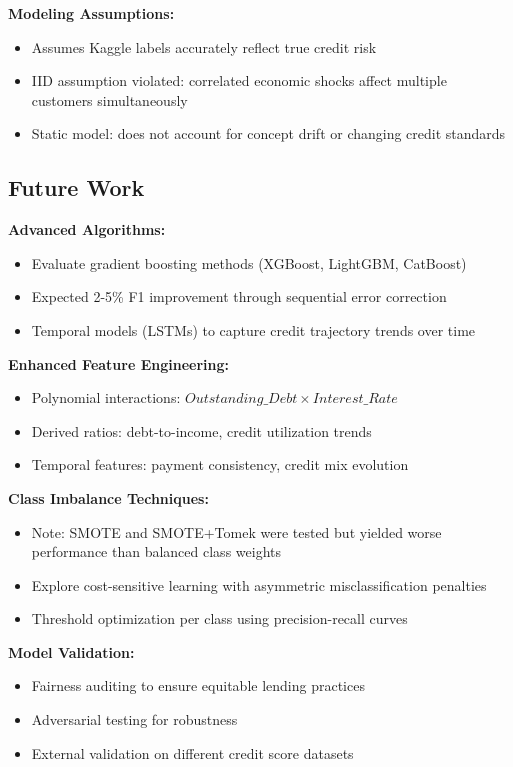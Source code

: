 \documentclass[11pt, a4paper]{article}
\begin{document}
\textbf{Modeling Assumptions:}
\begin{itemize}
    \item Assumes Kaggle labels accurately reflect true credit risk
    \item IID assumption violated: correlated economic shocks affect multiple customers simultaneously
    \item Static model: does not account for concept drift or changing credit standards
\end{itemize}

\subsection{Future Work}

\textbf{Advanced Algorithms:}
\begin{itemize}
    \item Evaluate gradient boosting methods (XGBoost, LightGBM, CatBoost)
    \item Expected 2-5\% F1 improvement through sequential error correction
    \item Temporal models (LSTMs) to capture credit trajectory trends over time
\end{itemize}

\textbf{Enhanced Feature Engineering:}
\begin{itemize}
    \item Polynomial interactions: $Outstanding\_Debt \times Interest\_Rate$
    \item Derived ratios: debt-to-income, credit utilization trends
    \item Temporal features: payment consistency, credit mix evolution
\end{itemize}

\textbf{Class Imbalance Techniques:}
\begin{itemize}
    \item Note: SMOTE and SMOTE+Tomek were tested but yielded worse performance than balanced class weights
    \item Explore cost-sensitive learning with asymmetric misclassification penalties
    \item Threshold optimization per class using precision-recall curves
\end{itemize}

\textbf{Model Validation:}
\begin{itemize}
    \item Fairness auditing to ensure equitable lending practices
    \item Adversarial testing for robustness
    \item External validation on different credit score datasets
\end{itemize}
\end{document}

